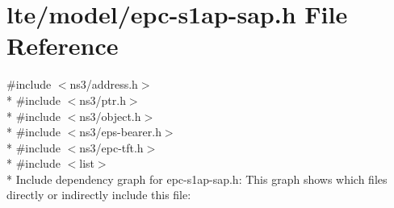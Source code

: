 \hypertarget{epc-s1ap-sap_8h}{}\section{lte/model/epc-\/s1ap-\/sap.h File Reference}
\label{epc-s1ap-sap_8h}
{\ttfamily \#include $<$ns3/address.\+h$>$}\\*
{\ttfamily \#include $<$ns3/ptr.\+h$>$}\\*
{\ttfamily \#include $<$ns3/object.\+h$>$}\\*
{\ttfamily \#include $<$ns3/eps-\/bearer.\+h$>$}\\*
{\ttfamily \#include $<$ns3/epc-\/tft.\+h$>$}\\*
{\ttfamily \#include $<$list$>$}\\*
Include dependency graph for epc-\/s1ap-\/sap.h\+:
This graph shows which files directly or indirectly include this file\+:
